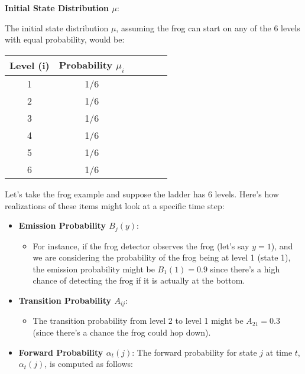 \documentclass[10pt]{article}
\begin{document}
\textbf{Initial State Distribution \( \mu \)}:

The initial state distribution \( \mu \), assuming the frog can start on any of the 6 levels with equal probability, would be:

\begin{table}[h]
\begin{center}
\begin{tabular}{|c|c|c|c|c|c|}
\hline
Level (i) & Probability \( \mu_i \)\\
\hline
1 & 1/6 \\
\hline
2 & 1/6 \\
\hline
3 & 1/6 \\
\hline
4 & 1/6 \\
\hline
5 & 1/6 \\
\hline
6 & 1/6 \\
\hline
\end{tabular}
\end{center}
\end{table}

Let's take the frog example and suppose the ladder has 6 levels. Here's how realizations of these items might look at a specific time step:

\begin{itemize}
  \item \textbf{Emission Probability \( B_j(y) \)}:

  \begin{itemize}
    \item For instance, if the frog detector observes the frog (let's say \( y = 1 \)), and we are considering the probability of the frog being at level 1 (state 1), the emission probability might be \( B_1(1) = 0.9 \) since there's a high chance of detecting the frog if it is actually at the bottom.
  \end{itemize}
  \item \textbf{Transition Probability \( A_{ij} \)}:

  \begin{itemize}
    \item The transition probability from level 2 to level 1 might be \( A_{21} = 0.3 \) (since there's a chance the frog could hop down).
  \end{itemize}
  \item \textbf{Forward Probability \( \alpha_t(j) \)}:
The forward probability for state \( j \) at time \( t \), \( \alpha_t(j) \), is computed as follows:

\end{itemize}
\end{document}
